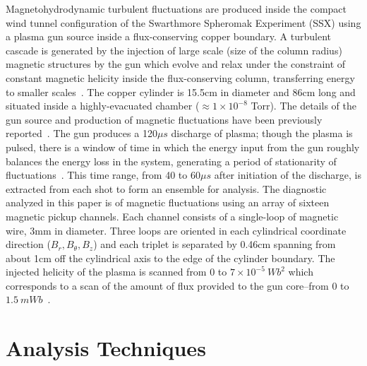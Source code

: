 \documentclass[preprint2]{aastex}
\begin{document}
Magnetohydrodynamic turbulent fluctuations are produced inside the compact wind tunnel configuration of the Swarthmore Spheromak Experiment (SSX) using a plasma gun source inside a flux-conserving copper boundary. A turbulent cascade is generated by the injection of large scale (size of the column radius) magnetic structures by the gun which evolve and relax under the constraint of constant magnetic helicity inside the flux-conserving column, transferring energy to smaller scales~\citep{schaffner2014c}. The copper cylinder is 15.5cm in diameter and 86cm long and situated inside a highly-evacuated chamber ($\approx 1 \times 10^{-8}$ Torr). The details of the gun source and production of magnetic fluctuations have been previously reported~\citep{schaffner2014c,brown14,brown15a}. The gun produces a 120$\mu s$ discharge of plasma; though the plasma is pulsed, there is a window of time in which the energy input from the gun roughly balances the energy loss in the system, generating a period of stationarity of fluctuations~\citep{schaffner2014a,brown14,brown15a}. This time range, from 40 to 60$\mu s$ after initiation of the discharge, is extracted from each shot to form an ensemble for analysis. The diagnostic analyzed in this paper is of magnetic fluctuations using an array of sixteen magnetic pickup channels. Each channel consists of a single-loop of magnetic wire, 3mm in diameter. Three loops are oriented in each cylindrical coordinate direction ($B_{r},B_{\theta},B_{z}$) and each triplet is separated by 0.46cm spanning from about 1cm off the cylindrical axis to the edge of the cylinder boundary. The injected helicity of the plasma is scanned from $0$ to $7\times 10^{-5}~Wb^{2}$ which corresponds to a scan of the amount of flux provided to the gun core--from $0$ to $1.5~mWb$~\citep{schaffner2014b}.

\section{Analysis Techniques}\label{sec:analysis}
\end{document}
